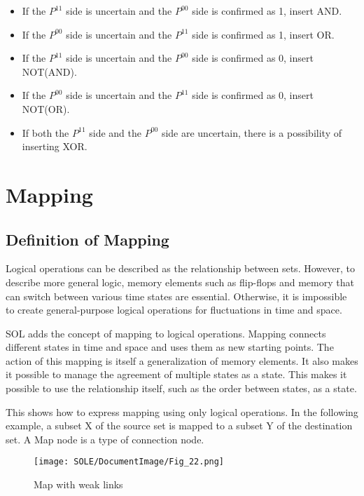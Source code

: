 \documentclass[12pt]{article}
\begin{document}
\begin{itemize}

\item
  If the \(P^{11}\) side is uncertain and the \(P^{00}\) side is
  confirmed as 1, insert AND.
\item
  If the \(P^{00}\) side is uncertain and the \(P^{11}\) side is
  confirmed as 1, insert OR.
\item
  If the \(P^{11}\) side is uncertain and the \(P^{00}\) side is
  confirmed as 0, insert NOT(AND).
\item
  If the \(P^{00}\) side is uncertain and the \(P^{11}\) side is
  confirmed as 0, insert NOT(OR).
\item
  If both the \(P^{11}\) side and the \(P^{00}\) side are uncertain,
  there is a possibility of inserting XOR.
\end{itemize}

\section{Mapping}\label{mapping}

\subsection{Definition of Mapping}\label{definition-of-mapping}

Logical operations can be described as the relationship between sets.
However, to describe more general logic, memory elements such as
flip-flops and memory that can switch between various time states are
essential. Otherwise, it is impossible to create general-purpose logical
operations for fluctuations in time and space.

SOL adds the concept of mapping to logical operations. Mapping connects
different states in time and space and uses them as new starting points.
The action of this mapping is itself a generalization of memory
elements. It also makes it possible to manage the agreement of multiple
states as a state. This makes it possible to use the relationship
itself, such as the order between states, as a state.

This shows how to express mapping using only logical operations. In the
following example, a subset X of the source set is mapped to a subset Y
of the destination set. A Map node is a type of connection node.

\begin{figure}[ht]
  \centering
  \texttt{[image: SOLE/DocumentImage/Fig\_22.png]}
  \caption{Map with weak links}
  \label{fig:map_with_weak_links}
\end{figure}
\end{document}
